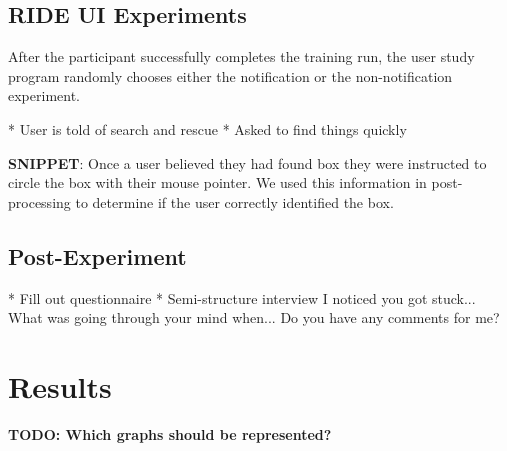 \subsection{RIDE UI Experiments} %
\label{sub:ride_ui_experiments}
After the participant successfully completes the training run, the user study program randomly chooses either the notification or the non-notification experiment.

\begin{TODO}
  * User is told of search and rescue
  * Asked to find things quickly
\end{TODO}

\textbf{SNIPPET}: Once a user believed they had found box they were instructed to circle the box with their mouse pointer. We used this information in post-processing to determine if the user correctly identified the box.

\subsection{Post-Experiment} %
\label{sub:post_experiment}
\begin{TODO}
  * Fill out questionnaire
  * Semi-structure interview
      I noticed you got stuck...
      What was going through your mind when...
      Do you have any comments for me?
\end{TODO}

\section{Results}
\textbf{TODO: Which graphs should be represented?}

